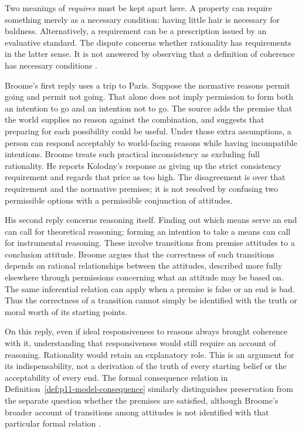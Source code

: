 Two meanings of \emph{requires} must be kept apart here. A property can
require something merely as a necessary condition: having little hair
is necessary for baldness. Alternatively, a requirement can be a prescription
issued by an evaluative standard. The dispute concerns whether rationality
has requirements in the latter sense. It is not answered by observing that
a definition of coherence has necessary conditions
\parencite[pp.~133--134]{Broome2021ReasonsRationality}.

Broome's first reply uses a trip to Paris. Suppose the normative reasons
permit going and permit not going. That alone does not imply permission
to form both an intention to go and an intention not to go. The source
adds the premise that the world supplies no reason against the combination,
and suggests that preparing for each possibility could be useful. Under
those extra assumptions, a person can respond acceptably to world-facing
reasons while having incompatible intentions. Broome treats such practical
inconsistency as excluding full rationality. He reports Kolodny's response
as giving up the strict consistency requirement and regards that price as
too high. The disagreement is over that requirement and the normative
premises; it is not resolved by confusing two permissible options with a
permissible conjunction of attitudes.

His second reply concerns reasoning itself. Finding out which means serve
an end can call for theoretical reasoning; forming an intention to take a
means can call for instrumental reasoning. These involve transitions from
premise attitudes to a conclusion attitude. Broome argues that the
correctness of such transitions depends on rational relationships between
the attitudes, described more fully elsewhere through permissions concerning
what an attitude may be based on. The same inferential relation can apply
when a premise is false or an end is bad. Thus the correctness of a transition
cannot simply be identified with the truth or moral worth of its starting
points.

On this reply, even if ideal responsiveness to reasons always brought
coherence with it, understanding that responsiveness would still require an
account of reasoning. Rationality would retain an explanatory role. This
is an argument for its indispensability, not a derivation of the truth of
every starting belief or the acceptability of every end. The formal
consequence relation in Definition~\ref{def:p11-model-consequence} similarly
distinguishes preservation from the separate question whether the premises
are satisfied, although Broome's broader account of transitions among
attitudes is not identified with that particular formal relation
\parencite[p.~134 and p.~135, n.~13]{Broome2021ReasonsRationality}.

